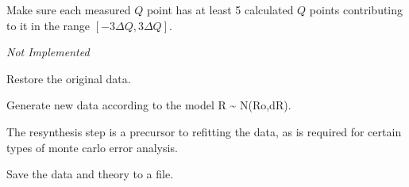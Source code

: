 \documentclass[letterpaper,10pt,english]{sphinxmanual}
\begin{document}
\begin{fulllineitems}

\begin{fulllineitems}
\label{api/probe:refl1d.probe.XrayProbe.plot_resolution}
\end{fulllineitems}


\begin{fulllineitems}
\label{api/probe:refl1d.probe.XrayProbe.resolution_guard}
Make sure each measured $Q$ point has at least 5 calculated $Q$
points contributing to it in the range $[-3\Delta Q,3\Delta Q]$.

\emph{Not Implemented}

\end{fulllineitems}


\begin{fulllineitems}
\label{api/probe:refl1d.probe.XrayProbe.restore_data}
Restore the original data.

\end{fulllineitems}


\begin{fulllineitems}
\label{api/probe:refl1d.probe.XrayProbe.resynth_data}
Generate new data according to the model R \textasciitilde{} N(Ro,dR).

The resynthesis step is a precursor to refitting the data, as is
required for certain types of monte carlo error analysis.

\end{fulllineitems}


\begin{fulllineitems}
\label{api/probe:refl1d.probe.XrayProbe.save}
Save the data and theory to a file.

\end{fulllineitems}


\end{fulllineitems}
\end{document}
